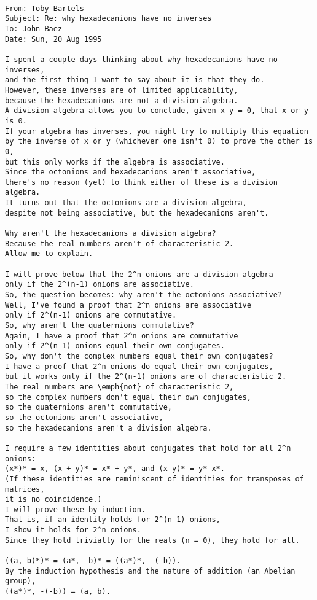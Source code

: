 \begin{verbatim}

From: Toby Bartels
Subject: Re: why hexadecanions have no inverses
To: John Baez
Date: Sun, 20 Aug 1995 

I spent a couple days thinking about why hexadecanions have no inverses,
and the first thing I want to say about it is that they do.
However, these inverses are of limited applicability,
because the hexadecanions are not a division algebra.
A division algebra allows you to conclude, given x y = 0, that x or y is 0.
If your algebra has inverses, you might try to multiply this equation
by the inverse of x or y (whichever one isn't 0) to prove the other is 0,
but this only works if the algebra is associative.
Since the octonions and hexadecanions aren't associative,
there's no reason (yet) to think either of these is a division algebra.
It turns out that the octonions are a division algebra,
despite not being associative, but the hexadecanions aren't.

Why aren't the hexadecanions a division algebra?
Because the real numbers aren't of characteristic 2.
Allow me to explain.

I will prove below that the 2^n onions are a division algebra
only if the 2^(n-1) onions are associative.
So, the question becomes: why aren't the octonions associative?
Well, I've found a proof that 2^n onions are associative
only if 2^(n-1) onions are commutative.
So, why aren't the quaternions commutative?
Again, I have a proof that 2^n onions are commutative
only if 2^(n-1) onions equal their own conjugates.
So, why don't the complex numbers equal their own conjugates?
I have a proof that 2^n onions do equal their own conjugates,
but it works only if the 2^(n-1) onions are of characteristic 2.
The real numbers are \emph{not} of characteristic 2,
so the complex numbers don't equal their own conjugates,
so the quaternions aren't commutative,
so the octonions aren't associative,
so the hexadecanions aren't a division algebra.

I require a few identities about conjugates that hold for all 2^n onions:
(x*)* = x, (x + y)* = x* + y*, and (x y)* = y* x*.
(If these identities are reminiscent of identities for transposes of matrices,
it is no coincidence.)
I will prove these by induction.
That is, if an identity holds for 2^(n-1) onions,
I show it holds for 2^n onions.
Since they hold trivially for the reals (n = 0), they hold for all.

((a, b)*)* = (a*, -b)* = ((a*)*, -(-b)).
By the induction hypothesis and the nature of addition (an Abelian group),
((a*)*, -(-b)) = (a, b).


\end{verbatim}
